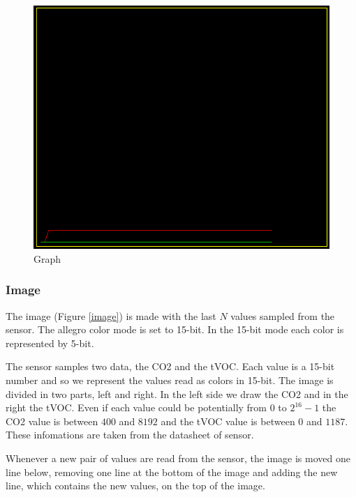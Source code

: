 \documentclass[12pt]{article}
\begin{document}
\begin{figure}[H]
    \centering
    \includegraphics[scale=0.55]{images/graph.png}
    \caption{Graph }
    \label{graph}
\end{figure}

\subsubsection*{Image}
The image (Figure \ref{image}) is made with the last $N$ values sampled from
the sensor. The allegro color mode is set to 15-bit. In the 15-bit mode each
color is represented by 5-bit.

The sensor samples two data, the CO2 and the tVOC. Each value is a 15-bit
number and so we represent the values read as colors in 15-bit. The image is
divided in two parts, left and right. In the left side we draw the CO2 and in
the right the tVOC. Even if each value could be potentially from $0$ to
$2^{16} - 1$ the CO2 value is between $400$ and $8192$ and the tVOC value is
between $0$ and $1187$. These infomations are taken from the datasheet of
sensor.

Whenever a new pair of values are read from the sensor, the image is moved
one line below, removing one line at the bottom of the image and adding the
new line, which contains the new values, on the top of the image.
\end{document}
